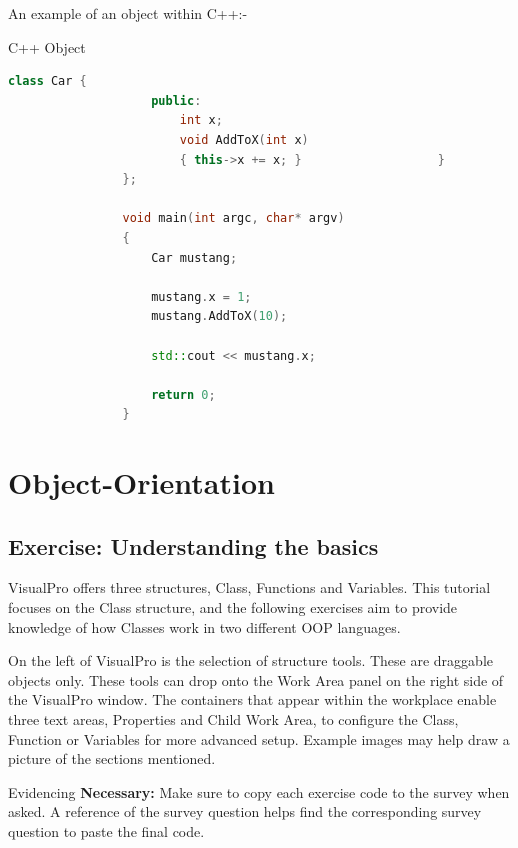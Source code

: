 \documentclass[10pt]{article}
\begin{document}
        \newpage
        An example of an object within C++:-
        \begin{example}{C++ Object}
            \begin{lstlisting}[language=c++]
                class Car {
                    public:
                        int x;
                        void AddToX(int x)
                        { this->x += x; }                   }
                };

                void main(int argc, char* argv)
                {
                    Car mustang;
                    
                    mustang.x = 1;
                    mustang.AddToX(10);
                    
                    std::cout << mustang.x;

                    return 0;
                }
            \end{lstlisting}
        \end{example}
\section{Object-Orientation}
\label{sec:object-orientation}

    \subsection{Exercise: Understanding the basics}
        VisualPro offers three structures, Class, Functions and Variables. This tutorial focuses on the Class structure, and the following exercises aim to provide knowledge of how Classes work in two different OOP languages.

        On the left of VisualPro is the selection of structure tools. These are draggable objects only. These tools can drop onto the Work Area panel on the right side of the VisualPro window. The containers that appear within the workplace enable three text areas, Properties and Child Work Area, to configure the Class, Function or Variables for more advanced setup. Example images may help draw a picture of the sections mentioned.

        \begin{tip}{Evidencing}
            \textbf{Necessary:} Make sure to copy each exercise code to the survey when asked. A reference of the survey question helps find the corresponding survey question to paste the final code.
        \end{tip}
\end{document}
